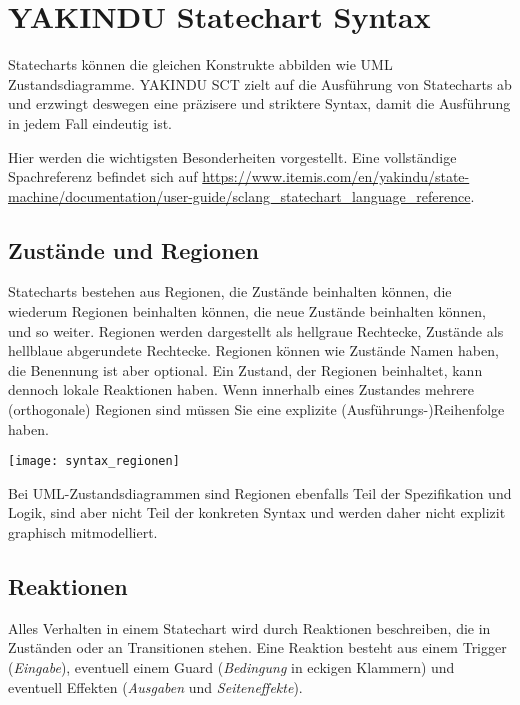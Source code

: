 
\section{YAKINDU Statechart Syntax}
\label{sec:syntax}

Statecharts können die gleichen Konstrukte abbilden wie UML Zustandsdiagramme.
YAKINDU SCT zielt auf die Ausführung von Statecharts ab und erzwingt deswegen eine präzisere und striktere Syntax, damit die Ausführung in jedem Fall eindeutig ist. 

Hier werden die wichtigsten Besonderheiten vorgestellt. Eine vollständige Spachreferenz befindet sich auf \url{https://www.itemis.com/en/yakindu/state-machine/documentation/user-guide/sclang_statechart_language_reference}.

\subsection{Zustände und Regionen}

Statecharts bestehen aus Regionen, die Zustände beinhalten können, die wiederum Regionen beinhalten können, die neue Zustände beinhalten können, und so weiter. Regionen werden dargestellt als hellgraue Rechtecke, Zustände als hellblaue abgerundete Rechtecke. 
Regionen können wie Zustände Namen haben, die Benennung ist aber optional. 
Ein Zustand, der Regionen beinhaltet, kann dennoch lokale Reaktionen haben. 
Wenn innerhalb eines Zustandes mehrere (orthogonale) Regionen sind müssen Sie eine explizite (Ausführungs-)Reihenfolge haben.

\begin{center}
	\texttt{[image: syntax\_regionen]}
\end{center}

Bei UML-Zustandsdiagrammen sind Regionen ebenfalls Teil der Spezifikation und Logik, sind aber nicht Teil der konkreten Syntax und werden daher nicht explizit graphisch mitmodelliert.


\subsection{Reaktionen}

Alles Verhalten in einem Statechart wird durch Reaktionen beschreiben, die in Zuständen oder an Transitionen stehen. 
Eine Reaktion besteht aus einem Trigger (\emph{Eingabe}), eventuell einem Guard (\emph{Bedingung} in eckigen Klammern) und eventuell Effekten (\emph{Ausgaben} und \emph{Seiteneffekte}). 


